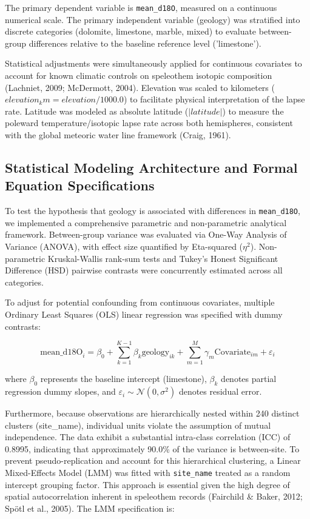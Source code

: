 \documentclass[sn-basic,Numbered]{sn-jnl}%
\begin{document}
The primary dependent variable is \texttt{mean\_d18O}, measured on a continuous numerical scale. The primary independent variable (geology) was stratified into discrete categories (dolomite, limestone, marble, mixed) to evaluate between-group differences relative to the baseline reference level ('limestone').

Statistical adjustments were simultaneously applied for continuous covariates to account for known climatic controls on speleothem isotopic composition (Lachniet, 2009; McDermott, 2004). Elevation was scaled to kilometers ($elevation_km = elevation / 1000.0$) to facilitate physical interpretation of the lapse rate. Latitude was modeled as absolute latitude ($|latitude|$) to measure the poleward temperature/isotopic lapse rate across both hemispheres, consistent with the global meteoric water line framework (Craig, 1961).

\subsection{Statistical Modeling Architecture and Formal Equation Specifications}

To test the hypothesis that geology is associated with differences in \texttt{mean\_d18O}, we implemented a comprehensive parametric and non-parametric analytical framework. Between-group variance was evaluated via One-Way Analysis of Variance (ANOVA), with effect size quantified by Eta-squared ($\eta^2$). Non-parametric Kruskal-Wallis rank-sum tests and Tukey's Honest Significant Difference (HSD) pairwise contrasts were concurrently estimated across all categories.

To adjust for potential confounding from continuous covariates, multiple Ordinary Least Squares (OLS) linear regression was specified with dummy contrasts:

\[
\text{mean\_d18O}_i = \beta_0 + \sum_{k=1}^{K-1} \beta_k \text{geology}_{ik} + \sum_{m=1}^{M} \gamma_m \text{Covariate}_{im} + \varepsilon_i
\]

where $\beta_0$ represents the baseline intercept (limestone), $\beta_k$ denotes partial regression dummy slopes, and $\varepsilon_i \sim \mathcal{N}(0, \sigma^2)$ denotes residual error.

Furthermore, because observations are hierarchically nested within 240 distinct clusters (site\_name), individual units violate the assumption of mutual independence. The data exhibit a substantial intra-class correlation (ICC) of 0.8995, indicating that approximately 90.0\% of the variance is between-site. To prevent pseudo-replication and account for this hierarchical clustering, a Linear Mixed-Effects Model (LMM) was fitted with \texttt{site\_name} treated as a random intercept grouping factor. This approach is essential given the high degree of spatial autocorrelation inherent in speleothem records (Fairchild \& Baker, 2012; Spötl et al., 2005). The LMM specification is:
\end{document}
